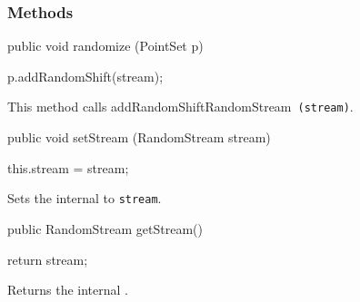 \subsubsection*{Methods}
\begin{code}

   public void randomize (PointSet p) \begin{hide} {
      p.addRandomShift(stream);
   } \end{hide}
\end{code}
\begin{tabb}
   This method calls
   {addRandomShift}{RandomStream}~\texttt{(stream)}.
\end{tabb}
\begin{htmlonly}
\end{htmlonly}
\begin{code}

   public void setStream (RandomStream stream) \begin{hide} {
      this.stream = stream;
   } \end{hide}
\end{code}
\begin{tabb}
   Sets the internal
    to
   \texttt{stream}.
\end{tabb}
\begin{htmlonly}
\end{htmlonly}
\begin{code}

   public RandomStream getStream() \begin{hide} {
      return stream;
   } \end{hide}
\end{code}
\begin{tabb}
   Returns the internal
   .
\end{tabb}
\begin{htmlonly}
\end{htmlonly}
\begin{code}\begin{hide}
}
\end{hide}\end{code}
